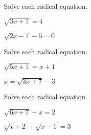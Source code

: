 \newpage

\begin{exercise}
	Solve each radical equation.

	\begin{enumerate*}[label={(\arabic*)~}, series=numinpar]
		\item $\sqrt{3x+1}=4$
		\item $\sqrt{2x-1}-5=0$
		\hfill\null
	\end{enumerate*}

\end{exercise}

	\vfill

	\begin{center} \hfill
	\end{center}

	
\begin{exercise}
	Solve each radical equation.

	\begin{enumerate*}[label={(\arabic*)~}]
		\item $\sqrt{5x+1}=x+1$
		\item $x=\sqrt{3x+7}-3$
		\hfill\null
	\end{enumerate*}
\end{exercise}
	
\vfill

	\begin{center} \hfill
	\end{center}

	\newpage

	\begin{exercise}
		Solve each radical equation.

	\begin{enumerate*}[label={(\arabic*)~}]
		\item $\sqrt{6x+7}-x=2$
		\item $\sqrt{x+2}+\sqrt{x-1}=3$
		\hfill\null
	\end{enumerate*}
\end{exercise}


